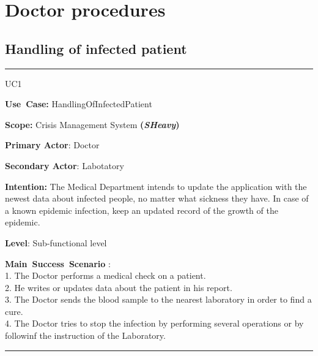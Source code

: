 \section{Doctor procedures}

\subsection{Handling of infected patient}
\vspace{0.5cm}
\hrule
\vspace{0.5cm}
\begin{lyxlist}{UC1}
\small{
\item [\textbf{Use~Case:}] HandlingOfInfectedPatient
\item [\textbf{Scope:}] Crisis Management System \textbf{(\emph{SHeavy})}
\item [\textbf{Primary Actor}:] Doctor
\item [\textbf{Secondary Actor}:] Labotatory
\item [\textbf{Intention:}]The Medical Department intends to update
the application with the newest data about infected people, no matter what
sickness they have. In case of a known epidemic infection, keep an updated
record of the growth of the epidemic.
\item [\textbf{Level}:]Sub-functional level
\item [\textbf{Main~Success~Scenario}]:\\
1. The Doctor performs a medical check on a patient.\\
2. He writes or updates data about the patient in his report.\\
3. The Doctor sends the blood sample to the nearest laboratory in order to find
a cure.\\
4. The Doctor tries to stop the infection by performing several operations or
by followinf the instruction of the Laboratory.\\
}
\end{lyxlist}
\hrule
\vspace{0.5cm} 

